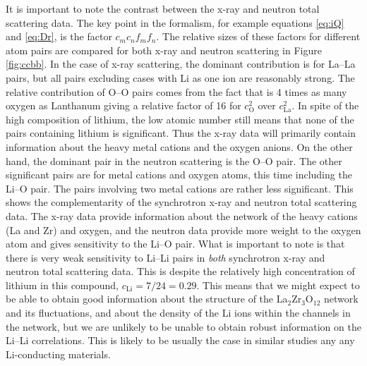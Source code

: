 \documentclass[twoside,twocolumn,9pt]{article}
\begin{document}
It is important to note the contrast between the x-ray and neutron total scattering data. The key point in the formalism, for example equations \ref{eq:iQ} and \ref{eq:Dr}, is the factor $c_m c_n f_m f_n$. The relative sizes of these factors for different atom pairs are compared for both x-ray and neutron scattering in Figure \ref{fig:ccbb}. In the case of x-ray scattering, the dominant contribution is for La--La pairs, but all pairs excluding cases with Li as one ion are reasonably strong. The relative contribution of O--O pairs comes from the fact that is 4 times as many oxygen as Lanthanum giving a relative factor of 16 for $c_\mathrm{O}^2$ over $c_\mathrm{La}^2$. In spite of the high composition of lithium, the low atomic number still means that none of the pairs containing lithium is significant. Thus the x-ray data will primarily contain information about the heavy metal cations and the oxygen anions. On the other hand, the dominant pair in the neutron scattering is the O--O pair. The other significant pairs are for metal cations and oxygen atoms, this time including the Li--O pair. The pairs involving two metal cations are rather less significant. This shows the complementarity of the synchrotron x-ray and neutron total scattering data. The x-ray data provide information about the network of the heavy cations (La and Zr) and oxygen, and the neutron data provide more weight to the oxygen atom and gives sensitivity to the Li--O pair. What is important to note is that there is very weak sensitivity to Li--Li pairs in \textit{both} synchrotron x-ray and neutron total scattering data. This is despite the relatively high concentration of lithium in this compound, $c_\mathrm{Li} = 7/24 = 0.29$. This means that we might expect to be able to obtain good information about the structure of the La$_2$Zr$_3$O$_{12}$ network and its fluctuations, and about the density of the Li ions within the channels in the network, but we are unlikely to be unable to obtain robust information on the Li--Li correlations. This is likely to be usually the case in similar studies any any Li-conducting materials.
\end{document}

